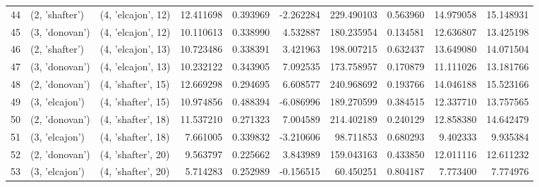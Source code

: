 \begin{tabular}{lllrrrrrrr}
44 &   (2, 'shafter') &  (4, 'elcajon', 12) &  12.411698 &  0.393969 &  -2.262284 &  229.490103 &  0.563960 &  14.979058 &  15.148931 \\
45 &   (3, 'donovan') &  (4, 'elcajon', 12) &  10.110613 &  0.338990 &   4.532887 &  180.235954 &  0.134581 &  12.636807 &  13.425198 \\
46 &   (2, 'shafter') &  (4, 'elcajon', 13) &  10.723486 &  0.338391 &   3.421963 &  198.007215 &  0.632437 &  13.649080 &  14.071504 \\
47 &   (3, 'donovan') &  (4, 'elcajon', 13) &  10.232122 &  0.343905 &   7.092535 &  173.758957 &  0.170879 &  11.111026 &  13.181766 \\
48 &   (2, 'donovan') &  (4, 'shafter', 15) &  12.669298 &  0.294695 &   6.608577 &  240.968692 &  0.193766 &  14.046188 &  15.523166 \\
49 &   (3, 'elcajon') &  (4, 'shafter', 15) &  10.974856 &  0.488394 &  -6.086996 &  189.270599 &  0.384515 &  12.337710 &  13.757565 \\
50 &   (2, 'donovan') &  (4, 'shafter', 18) &  11.537210 &  0.271323 &   7.004589 &  214.402189 &  0.240129 &  12.858380 &  14.642479 \\
51 &   (3, 'elcajon') &  (4, 'shafter', 18) &   7.661005 &  0.339832 &  -3.210606 &   98.711853 &  0.680293 &   9.402333 &   9.935384 \\
52 &   (2, 'donovan') &  (4, 'shafter', 20) &   9.563797 &  0.225662 &   3.843989 &  159.043163 &  0.433850 &  12.011116 &  12.611232 \\
53 &   (3, 'elcajon') &  (4, 'shafter', 20) &   5.714283 &  0.252989 &  -0.156515 &   60.450251 &  0.804187 &   7.773400 &   7.774976 \\
\bottomrule
\end{tabular}
